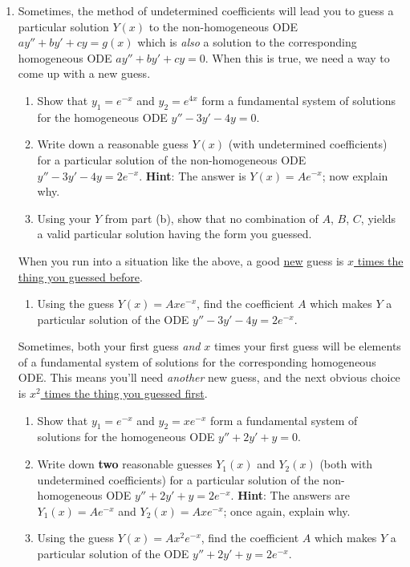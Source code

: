 \documentclass[12pt]{article}
\newcommand{\hint}[1]{\textbf{Hint}: #1}
\begin{document}
\begin{enumerate}
		\item Sometimes, the method of undetermined coefficients will lead you to guess a particular solution $Y(x)$ to the non-homogeneous ODE $ay''+by'+cy=g(x)$ which is \textit{also} a solution to the corresponding homogeneous ODE $ay''+by'+cy=0$. When this is true, we need a way to come up with a new guess.
		\begin{enumerate}[itemsep=0.7in]
			\item Show that $y_1=e^{-x}$ and $y_2=e^{4x}$ form a fundamental system of solutions for the homogeneous ODE $y''-3y'-4y=0$.
			\item Write down a reasonable guess $Y(x)$ (with undetermined coefficients) for a particular solution of the non-homogeneous ODE $y''-3y'-4y=2e^{-x}$. \hint{The answer is $Y(x)=Ae^{-x}$; now explain why.}
			\item Using your $Y$ from part (b), show that no combination of $A$, $B$, $C$, \textellipsis yields a valid particular solution having the form you guessed.
		\end{enumerate}
		\vspace{0.7in}
		\noindent When you run into a situation like the above, a good \ul{new} guess is \ul{$x$ times the thing you guessed before}.
		\begin{enumerate}[resume,topsep=1.5mm]
			\item Using the guess $Y(x)=Axe^{-x}$, find the coefficient $A$ which makes $Y$ a particular solution of the ODE $y''-3y'-4y=2e^{-x}$.
		\end{enumerate}
		\vspace{0.7in}
		\noindent Sometimes, both your first guess \textit{and} $x$ times your first guess will be elements of a fundamental system of solutions for the corresponding homogeneous ODE. This means you'll need \textit{another} new guess, and the next obvious choice is \ul{$x^2$ times the thing you guessed first}.
		\begin{enumerate}[resume,topsep=1.5mm,itemsep=0.7in]
			\item Show that $y_1=e^{-x}$ and $y_2=xe^{-x}$ form a fundamental system of solutions for the homogeneous ODE $y''+2y'+y=0$.
			\item Write down \textbf{two} reasonable guesses $Y_1(x)$ and $Y_2(x)$ (both with undetermined coefficients) for a particular solution of the non-homogeneous ODE $y''+2y'+y=2e^{-x}$. \hint{The answers are $Y_1(x)=Ae^{-x}$ and $Y_2(x)=Axe^{-x}$; once again, explain why.}
			\item Using the guess $Y(x)=Ax^2e^{-x}$, find the coefficient $A$ which makes $Y$ a particular solution of the ODE $y''+2y'+y=2e^{-x}$.
		\end{enumerate}
		
	\end{enumerate}
\end{document}
